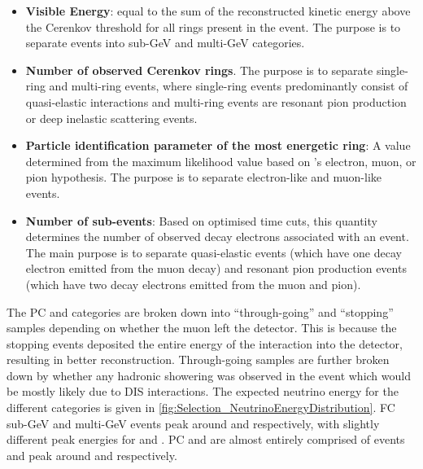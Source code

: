 \begin{itemize}
    \item \textbf{Visible Energy}: equal to the sum of the reconstructed kinetic energy above the Cerenkov threshold for all rings present in the event. The purpose is to separate events into sub-GeV and multi-GeV categories. 
    \item \textbf{Number of observed Cerenkov rings}. The purpose is to separate single-ring and multi-ring events, where single-ring events predominantly consist of quasi-elastic interactions and multi-ring events are resonant pion production or deep inelastic scattering events.
    \item \textbf{Particle identification parameter of the most energetic ring}: A value determined from the maximum likelihood value based on \fq's electron, muon, or pion hypothesis. The purpose is to separate electron-like and muon-like events.
    \item \textbf{Number of sub-events}: Based on optimised time cuts, this quantity determines the number of observed decay electrons associated with an event. The main purpose is to separate quasi-elastic events (which have one decay electron emitted from the muon decay) and resonant pion production events (which have two decay electrons emitted from the muon and pion).
\end{itemize}

The PC and  categories are broken down into ``through-going'' and ``stopping'' samples depending on whether the muon left the detector. This is because the stopping events deposited the entire energy of the interaction into the detector, resulting in better reconstruction. Through-going  samples are further broken down by whether any hadronic showering was observed in the event which would be mostly likely due to DIS interactions. The expected neutrino energy for the different categories is given in \autoref{fig:Selection_NeutrinoEnergyDistribution}. FC sub-GeV and multi-GeV events peak around  and  respectively, with slightly different peak energies for  and . PC and  are almost entirely comprised of  events and peak around  and  respectively.

